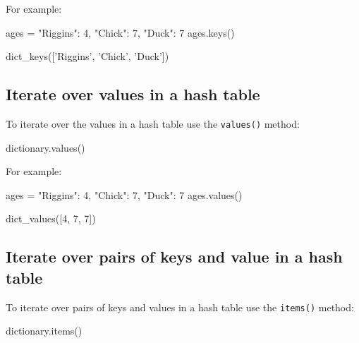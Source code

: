 For example:




\begin{pyin}
ages = {"Riggins": 4, "Chick": 7, "Duck": 7}
ages.keys()
\end{pyin}





\begin{raw}
dict_keys(['Riggins', 'Chick', 'Duck'])
\end{raw}





\subsection{Iterate over values in a hash table}
\label{\detokenize{building-tools/02-functions-and-data-structures/how/main:iterate-over-values-in-a-hash-table}}

To iterate over the values in a hash table use the \texttt{values()} method:


\begin{pyin}
dictionary.values()
\end{pyin}



For example:




\begin{pyin}
ages = {"Riggins": 4, "Chick": 7, "Duck": 7}
ages.values()
\end{pyin}





\begin{pyin}
dict_values([4, 7, 7])
\end{pyin}





\subsection{Iterate over pairs of keys and value in a hash table}
\label{\detokenize{building-tools/02-functions-and-data-structures/how/main:iterate-over-pairs-of-keys-and-value-in-a-hash-table}}

To iterate over pairs of keys and values in a hash table use the \texttt{items()} method:


\begin{pyin}
dictionary.items()
\end{pyin}




